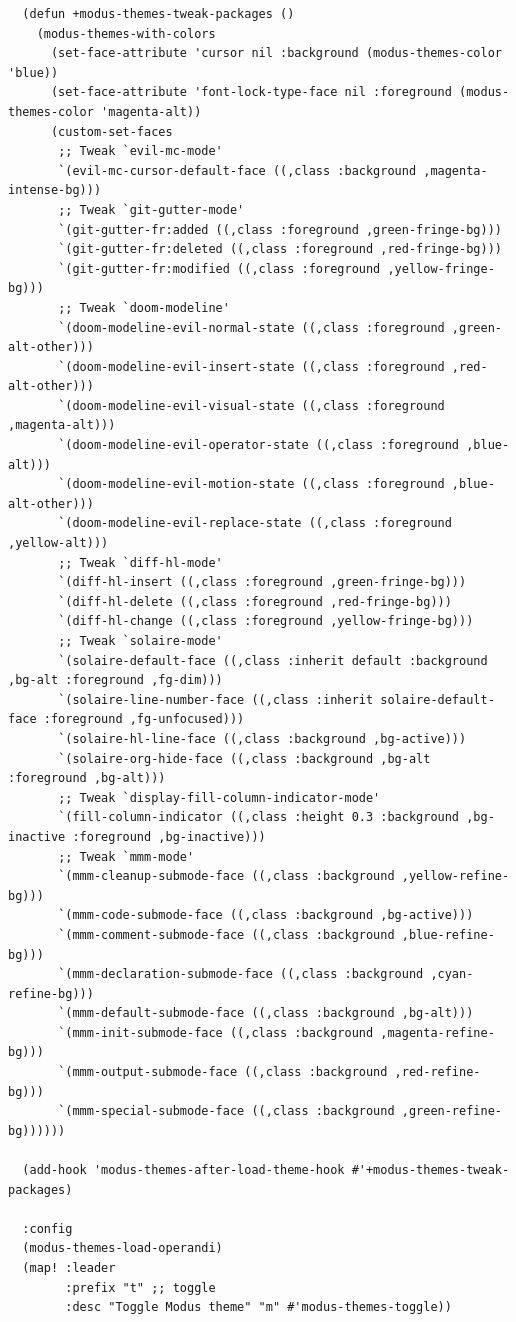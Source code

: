 \documentclass[11pt]{article}
\begin{document}
\begin{verbatim}
  (defun +modus-themes-tweak-packages ()
    (modus-themes-with-colors
      (set-face-attribute 'cursor nil :background (modus-themes-color 'blue))
      (set-face-attribute 'font-lock-type-face nil :foreground (modus-themes-color 'magenta-alt))
      (custom-set-faces
       ;; Tweak `evil-mc-mode'
       `(evil-mc-cursor-default-face ((,class :background ,magenta-intense-bg)))
       ;; Tweak `git-gutter-mode'
       `(git-gutter-fr:added ((,class :foreground ,green-fringe-bg)))
       `(git-gutter-fr:deleted ((,class :foreground ,red-fringe-bg)))
       `(git-gutter-fr:modified ((,class :foreground ,yellow-fringe-bg)))
       ;; Tweak `doom-modeline'
       `(doom-modeline-evil-normal-state ((,class :foreground ,green-alt-other)))
       `(doom-modeline-evil-insert-state ((,class :foreground ,red-alt-other)))
       `(doom-modeline-evil-visual-state ((,class :foreground ,magenta-alt)))
       `(doom-modeline-evil-operator-state ((,class :foreground ,blue-alt)))
       `(doom-modeline-evil-motion-state ((,class :foreground ,blue-alt-other)))
       `(doom-modeline-evil-replace-state ((,class :foreground ,yellow-alt)))
       ;; Tweak `diff-hl-mode'
       `(diff-hl-insert ((,class :foreground ,green-fringe-bg)))
       `(diff-hl-delete ((,class :foreground ,red-fringe-bg)))
       `(diff-hl-change ((,class :foreground ,yellow-fringe-bg)))
       ;; Tweak `solaire-mode'
       `(solaire-default-face ((,class :inherit default :background ,bg-alt :foreground ,fg-dim)))
       `(solaire-line-number-face ((,class :inherit solaire-default-face :foreground ,fg-unfocused)))
       `(solaire-hl-line-face ((,class :background ,bg-active)))
       `(solaire-org-hide-face ((,class :background ,bg-alt :foreground ,bg-alt)))
       ;; Tweak `display-fill-column-indicator-mode'
       `(fill-column-indicator ((,class :height 0.3 :background ,bg-inactive :foreground ,bg-inactive)))
       ;; Tweak `mmm-mode'
       `(mmm-cleanup-submode-face ((,class :background ,yellow-refine-bg)))
       `(mmm-code-submode-face ((,class :background ,bg-active)))
       `(mmm-comment-submode-face ((,class :background ,blue-refine-bg)))
       `(mmm-declaration-submode-face ((,class :background ,cyan-refine-bg)))
       `(mmm-default-submode-face ((,class :background ,bg-alt)))
       `(mmm-init-submode-face ((,class :background ,magenta-refine-bg)))
       `(mmm-output-submode-face ((,class :background ,red-refine-bg)))
       `(mmm-special-submode-face ((,class :background ,green-refine-bg))))))

  (add-hook 'modus-themes-after-load-theme-hook #'+modus-themes-tweak-packages)

  :config
  (modus-themes-load-operandi)
  (map! :leader
        :prefix "t" ;; toggle
        :desc "Toggle Modus theme" "m" #'modus-themes-toggle))
\end{verbatim}
\end{document}
